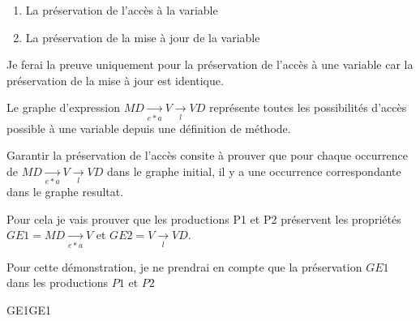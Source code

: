 \documentclass[a4paper, 12pt]{article}
\begin{document}
  \begin{enumerate}
    \item La préservation de l'accès à la variable
    \item La préservation de la mise à jour de la variable
  \end{enumerate}

  Je ferai la preuve uniquement pour la préservation de l'accès à une variable car la préservation de la mise à jour est identique.

  Le graphe d'expression  \(MD \underset{e * a}{\rightarrow} V \underset{l}{\rightarrow}  VD\) représente toutes les possibilités d'accès possible à une variable depuis une définition de méthode.

  Garantir la préservation de l'accès consite à prouver que pour chaque occurrence de \(MD \underset{e * a}{\rightarrow} V \underset{l}{\rightarrow} VD\)
  dans le graphe initial, il y a une occurrence correspondante dans le graphe resultat.

  Pour cela je vais prouver que les productions P1 et P2 préservent les propriétés \(GE1 = MD \underset{e * a}{\rightarrow} V \) et  \(GE2 = V \underset{l}{\rightarrow}  VD\).

  Pour cette démonstration, je ne prendrai en compte que la préservation $GE1$ dans les productions $P1$ et $P2$

  \begin{myfig}{GE1}{GE1}
    \begin{center}
    \end{center}
  \end{myfig}
\end{document}
